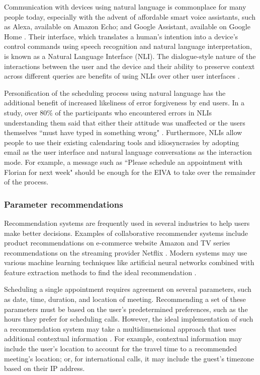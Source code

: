 \documentclass{article}
\begin{document}
Communication with devices using natural language is commonplace for many people today, especially with the advent of affordable smart voice assistants, such as Alexa, available on Amazon Echo; and Google Assistant, available on Google Home \cite{de_barcelos_silva_intelligent_2020}. Their interface, which translates a human's intention into a device's control commands using speech recognition and natural language interpretation, is known as a Natural Language Interface (NLI). The dialogue-style nature of the interactions between the user and the device and their ability to preserve context across different queries are benefits of using NLIs over other user interfaces \cite{kiseleva_predicting_2016}.

Personification of the scheduling process using natural language has the additional benefit of increased likeliness of error forgiveness by end users. In a study, over 80\% of the participants who encountered errors in NLIs understanding them said that either their attitude was unaffected or the users themselves ``must have typed in something wrong" \cite{kelley_iterative_1984}. Furthermore, NLIs allow people to use their existing calendaring tools and idiosyncrasies by adopting email as the user interface and natural language conversations as the interaction mode. For example, a message such as ``Please schedule an appointment with Florian for next week" should be enough for the EIVA to take over the remainder of the process.

\subsubsection{Parameter recommendations}

Recommendation systems are frequently used in several industries to help users make better decisions. Examples of collaborative recommender systems include product recommendations on e-commerce website Amazon \cite{linden_amazoncom_2003} and TV series recommendations on the streaming provider Netflix \cite{gomez-uribe_netflix_2016}. Modern systems may use various machine learning techniques like artificial neural networks combined with feature extraction methods to find the ideal recommendation \cite{adomavicius_toward_2005}.

Scheduling a single appointment requires agreement on several parameters, such as date, time, duration, and location of meeting. Recommending a set of these parameters must be based on the user's predetermined preferences, such as the hours they prefer for scheduling calls. However, the ideal implementation of such a recommendation system may take a multidimensional approach that uses additional contextual information \cite{adomavicius_incorporating_2005}. For example, contextual information may include the user's location to account for the travel time to a recommended meeting's location; or, for international calls, it may include the guest's timezone based on their IP address.
\end{document}
